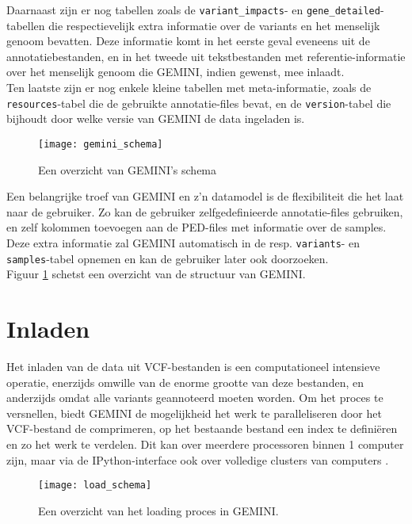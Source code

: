 Daarnaast zijn er nog tabellen zoals de \texttt{variant\_impacts}- en \texttt{gene\_detailed}-tabellen die respectievelijk extra informatie over de variants en het menselijk genoom bevatten. Deze informatie komt in het eerste geval eveneens uit de annotatiebestanden, en in het tweede uit tekstbestanden met referentie-informatie over het menselijk genoom die GEMINI, indien gewenst, mee inlaadt.\\
Ten laatste zijn er nog enkele kleine tabellen met meta-informatie, zoals de \texttt{resources}-tabel die de gebruikte annotatie-files bevat, en de \texttt{version}-tabel die bijhoudt door welke versie van GEMINI de data ingeladen is.\\

\begin{figure}[!h]
\texttt{[image: gemini\_schema]}
\caption{Een overzicht van GEMINI's schema \cite{10.1371/journal.pcbi.1003153}}
\label{gemini_schema_pic}
\end{figure}

Een belangrijke troef van GEMINI en z'n datamodel is de flexibiliteit die het laat naar de gebruiker. Zo kan de gebruiker zelfgedefinieerde annotatie-files gebruiken, en zelf kolommen toevoegen aan de PED-files met informatie over de samples. Deze extra informatie zal GEMINI automatisch in de resp. \texttt{variants}- en \texttt{samples}-tabel opnemen en kan de gebruiker later ook doorzoeken.\\

Figuur \ref{gemini_schema_pic} schetst een overzicht van de structuur van GEMINI.

\section{Inladen}
\label{loading_origineel}
Het inladen van de data uit VCF-bestanden is een computationeel intensieve operatie, enerzijds omwille van de enorme grootte van deze bestanden, en anderzijds omdat alle variants geannoteerd moeten worden. Om het proces te versnellen, biedt GEMINI de mogelijkheid het werk te paralleliseren door het VCF-bestand de comprimeren, op het bestaande bestand een index te defini\"eren en zo het werk te verdelen. Dit kan over meerdere processoren binnen 1 computer zijn, maar via de IPython-interface ook over volledige clusters van computers \cite{PER-GRA:2007}.\\

\begin{figure}[!h]
\texttt{[image: load\_schema]}
\caption{Een overzicht van het loading proces in GEMINI.}
\label{load_schema}
\end{figure}

